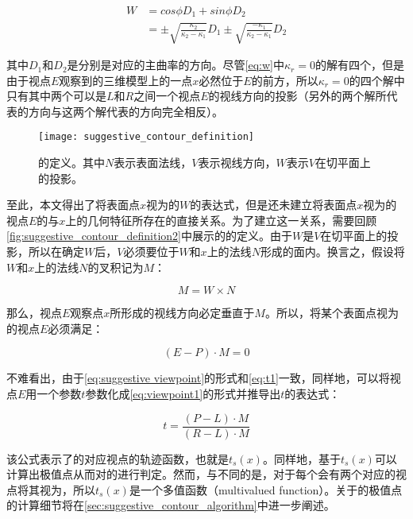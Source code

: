 \begin{align}
    W &= cos{\phi}D_1+sin{\phi}D_2 \\
    &= \pm\sqrt{\frac{\kappa_2}{\kappa_2-\kappa_1}}D_1\pm\sqrt{\frac{-\kappa_1}{\kappa_2-\kappa_1}}D_2 \label{eq:w}
\end{align}

其中$D_1$和$D_2$是分别是对应的主曲率的方向。尽管\autoref{eq:w}中$\kappa_r = 0$的解有四个，但是由于视点$E$观察到的三维模型上的一点$x$必然位于$E$的前方，所以$\kappa_r = 0$的四个解中只有其中两个可以是$L$和$R$之间一个视点$E$的视线方向的投影（另外的两个解所代表的方向与这两个解代表的方向完全相反）。

\begin{figure}[tbp]
    \centering
    \texttt{[image: suggestive\_contour\_definition]}
    \caption[\scon{}的定义]{\label{fig:suggestive_contour_definition2}
    \scon{}的定义。其中$N$表示表面法线，$V$表示视线方向，$W$表示$V$在切平面上的投影。}
\end{figure}

至此，本文得出了将表面点$x$视为\sconp{}的$W$的表达式，但是还未建立将表面点$x$视为\sconp{}的视点$E$的与$x$上的几何特征所存在的直接关系。为了建立这一关系，需要回顾\autoref{fig:suggestive_contour_definition2}中展示的\scon{}的定义。由于$W$是$V$在切平面上的投影，所以在确定$W$后，$V$必须要位于$W$和$x$上的法线$N$形成的面内。换言之，假设将$W$和$x$上的法线$N$的叉积记为$M$：

\begin{equation}\label{eq:suggestive viewpoint}
    M = W \times N
\end{equation}

那么，视点$E$观察点$x$所形成的视线方向必定垂直于$M$。所以，将某个表面点视为\sconp{}的视点$E$必须满足：

\begin{equation}\label{eq:suggestive viewpoint}
    {(E - P)}\cdot{M} = 0
\end{equation}

不难看出，由于\autoref{eq:suggestive viewpoint}的形式和\autoref{eq:t1}一致，同样地，可以将视点$E$用一个参数$t$参数化成\autoref{eq:viewpoint1}的形式并推导出$t$的表达式：

\begin{equation}\label{eq:suggestive trajectory}
    t = \frac{(P-L)\cdot{M}}{(R-L)\cdot{M}}
\end{equation}

该公式表示了\scon{}的对应视点的轨迹函数，也就是$t_s(x)$。同样地，基于$t_s(x)$可以计算出极值点从而对\scon{}的\epsl{}进行判定。然而，与\con{}不同的是，对于每个\sconp{}会有两个对应的视点将其视为\sconp{}，所以$t_s(x)$是一个多值函数（multivalued function）。关于\scon{}的极值点的计算细节将在\ref{sec:suggestive_contour_algorithm}中进一步阐述。


